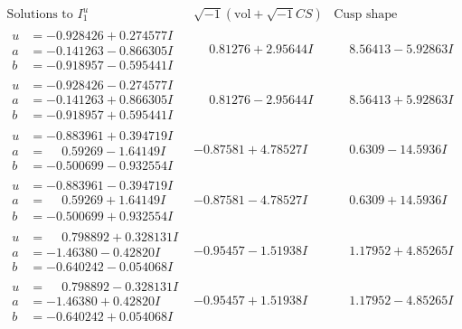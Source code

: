 \documentclass[1p]{elsarticle_modified}
\theoremstyle{definition}
\newcommand{\I}{\sqrt{-1}}
\begin{document}
$$\begin{array}{c|c|c}  
\text{Solutions to }I^u_{1}& \I (\text{vol} + \sqrt{-1}CS) & \text{Cusp shape}\\
 \hline 
\begin{aligned}
u &= -0.928426 + 0.274577 I \\
a &= -0.141263 - 0.866305 I \\
b &= -0.918957 - 0.595441 I\end{aligned}
 & \phantom{-}0.81276 + 2.95644 I & \phantom{-}8.56413 - 5.92863 I \\ \hline\begin{aligned}
u &= -0.928426 - 0.274577 I \\
a &= -0.141263 + 0.866305 I \\
b &= -0.918957 + 0.595441 I\end{aligned}
 & \phantom{-}0.81276 - 2.95644 I & \phantom{-}8.56413 + 5.92863 I \\ \hline\begin{aligned}
u &= -0.883961 + 0.394719 I \\
a &= \phantom{-}0.59269 - 1.64149 I \\
b &= -0.500699 - 0.932554 I\end{aligned}
 & -0.87581 + 4.78527 I & \phantom{-}0.6309 - 14.5936 I \\ \hline\begin{aligned}
u &= -0.883961 - 0.394719 I \\
a &= \phantom{-}0.59269 + 1.64149 I \\
b &= -0.500699 + 0.932554 I\end{aligned}
 & -0.87581 - 4.78527 I & \phantom{-}0.6309 + 14.5936 I \\ \hline\begin{aligned}
u &= \phantom{-}0.798892 + 0.328131 I \\
a &= -1.46380 - 0.42820 I \\
b &= -0.640242 - 0.054068 I\end{aligned}
 & -0.95457 - 1.51938 I & \phantom{-}1.17952 + 4.85265 I \\ \hline\begin{aligned}
u &= \phantom{-}0.798892 - 0.328131 I \\
a &= -1.46380 + 0.42820 I \\
b &= -0.640242 + 0.054068 I\end{aligned}
 & -0.95457 + 1.51938 I & \phantom{-}1.17952 - 4.85265 I \\ \hline\begin{aligned}

\end{aligned}
\end{array}$$
\end{document}
